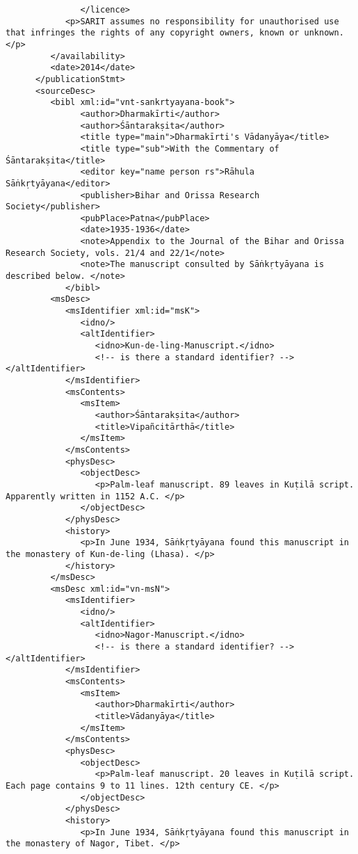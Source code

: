 \documentclass[article,12pt,a4paper]{memoir}%
\begin{document}
\begin{verbatim}
	           </licence>
            <p>SARIT assumes no responsibility for unauthorised use that infringes the rights of any copyright owners, known or unknown. </p>
         </availability>
         <date>2014</date>
      </publicationStmt>
      <sourceDesc>
         <bibl xml:id="vnt-sankrtyayana-book">
	           <author>Dharmakīrti</author>
	           <author>Śāntarakṣita</author>
	           <title type="main">Dharmakīrti's Vādanyāya</title>
	           <title type="sub">With the Commentary of Śāntarakṣita</title>
	           <editor key="name person rs">Rāhula Sāṅkṛtyāyana</editor>
	           <publisher>Bihar and Orissa Research Society</publisher>
	           <pubPlace>Patna</pubPlace>
	           <date>1935-1936</date>
	           <note>Appendix to the Journal of the Bihar and Orissa Research Society, vols. 21/4 and 22/1</note>
	           <note>The manuscript consulted by Sāṅkṛtyāyana is described below. </note>
	        </bibl>
         <msDesc>
            <msIdentifier xml:id="msK">
               <idno/>
               <altIdentifier>
                  <idno>Kun-de-ling-Manuscript.</idno>
                  <!-- is there a standard identifier? --></altIdentifier>
            </msIdentifier>
            <msContents>
               <msItem>
                  <author>Śāntarakṣita</author>
                  <title>Vipañcitārthā</title>
               </msItem>
            </msContents>
            <physDesc>
               <objectDesc>
                  <p>Palm-leaf manuscript. 89 leaves in Kuṭilā script. Apparently written in 1152 A.C. </p>
               </objectDesc>
            </physDesc>
            <history>
               <p>In June 1934, Sāṅkṛtyāyana found this manuscript in the monastery of Kun-de-ling (Lhasa). </p>
            </history>
         </msDesc>
         <msDesc xml:id="vn-msN">
            <msIdentifier>
               <idno/>
               <altIdentifier>
                  <idno>Nagor-Manuscript.</idno>
                  <!-- is there a standard identifier? --></altIdentifier>
            </msIdentifier>
            <msContents>
               <msItem>
                  <author>Dharmakīrti</author>
                  <title>Vādanyāya</title>
               </msItem>
            </msContents>
            <physDesc>
               <objectDesc>
                  <p>Palm-leaf manuscript. 20 leaves in Kuṭilā script. Each page contains 9 to 11 lines. 12th century CE. </p>
               </objectDesc>
            </physDesc>
            <history>
               <p>In June 1934, Sāṅkṛtyāyana found this manuscript in the monastery of Nagor, Tibet. </p>

\end{verbatim}
\end{document}
